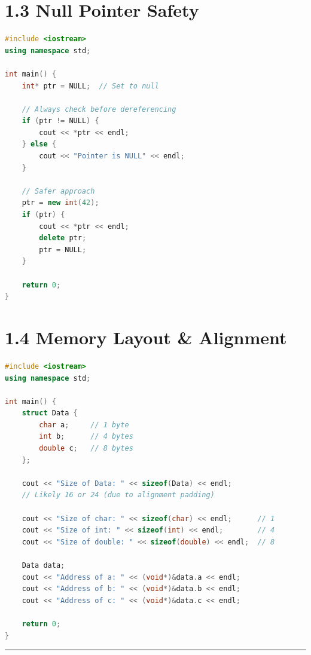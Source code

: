 \hypertarget{null-pointer-safety}{%
\section{1.3 Null Pointer Safety}\label{null-pointer-safety}}

\begin{lstlisting}[language={C++}]
#include <iostream>
using namespace std;

int main() {
    int* ptr = NULL;  // Set to null
    
    // Always check before dereferencing
    if (ptr != NULL) {
        cout << *ptr << endl;
    } else {
        cout << "Pointer is NULL" << endl;
    }
    
    // Safer approach
    ptr = new int(42);
    if (ptr) {
        cout << *ptr << endl;
        delete ptr;
        ptr = NULL;
    }
    
    return 0;
}
\end{lstlisting}

\hypertarget{memory-layout-alignment}{%
\section{1.4 Memory Layout \& Alignment}\label{memory-layout-alignment}}

\begin{lstlisting}[language={C++}]
#include <iostream>
using namespace std;

int main() {
    struct Data {
        char a;     // 1 byte
        int b;      // 4 bytes
        double c;   // 8 bytes
    };
    
    cout << "Size of Data: " << sizeof(Data) << endl;
    // Likely 16 or 24 (due to alignment padding)
    
    cout << "Size of char: " << sizeof(char) << endl;      // 1
    cout << "Size of int: " << sizeof(int) << endl;        // 4
    cout << "Size of double: " << sizeof(double) << endl;  // 8
    
    Data data;
    cout << "Address of a: " << (void*)&data.a << endl;
    cout << "Address of b: " << (void*)&data.b << endl;
    cout << "Address of c: " << (void*)&data.c << endl;
    
    return 0;
}
\end{lstlisting}

\begin{center}\rule{0.5\linewidth}{0.5pt}\end{center}
